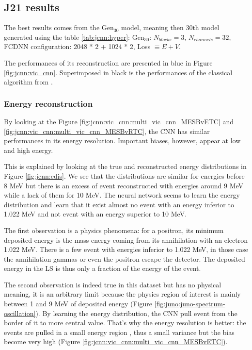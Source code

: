 \documentclass[../main.tex]{subfiles}
\begin{document}
\subsection{J21 results}

The best results comes from the $\mathrm{Gen}_{30}$ model, meaning then 30th model generated using the table \ref{tab:jcnn:hyper}: $\mathrm{Gen}_{30}$: $N_{blocks} = 3$, $N_{channels} = 32$, FCDNN configuration: 2048 * 2 + 1024 * 2, Loss $\equiv E+V$.

The performances of its reconstruction are presented in blue in Figure \ref{fig:jcnn:vic_cnn}. Superimposed in black is the performances of the classical algorithm from \cite{lebrin_towards_2022}.

\subsubsection{Energy reconstruction}

By looking at the Figure \ref{fig:jcnn:vic_cnn:multi_vic_cnn_MESBvETC} and \ref{fig:jcnn:vic_cnn:multi_vic_cnn_MESBvRTC}, the CNN has similar performances in its energy resolution. Important biases, however, appear at low and high energy.

This is explained by looking at the true and reconstructed energy distributions in Figure \ref{fig:jcnn:edis}. We see that the distributions are similar for energies before 8 MeV but there is an excess of event reconstructed with energies around 9 MeV while a lack of them for 10 MeV. The neural network seems to learn the energy distribution and learn that it exist almost no event with an energy inferior to 1.022 MeV and not event with an energy superior to 10 MeV.

The first observation is a physics phenomena: for a positron, its minimum deposited energy is the mass energy coming from its annihilation with an electron 1.022 MeV. There is a few event with energies inferior to 1.022 MeV, in those case the annihilation gammas or even the positron escape the detector. The deposited energy in the LS is thus only a fraction of the energy of the event.

The second observation is indeed true in this dataset but has no physical meaning, it is an arbitrary limit because the physics region of interest is mainly between 1 and 9 MeV of deposited energy (Figure \ref{fig:juno:juno-spectrum-oscillation}). By learning the energy distribution, the CNN pull event from the border of it to more central value. That's why the energy resolution is better: the events are pulled in a small energy region , thus a small variance but the bias become very high (Figure \ref{fig:jcnn:vic_cnn:multi_vic_cnn_MESBvETC}).
\end{document}
